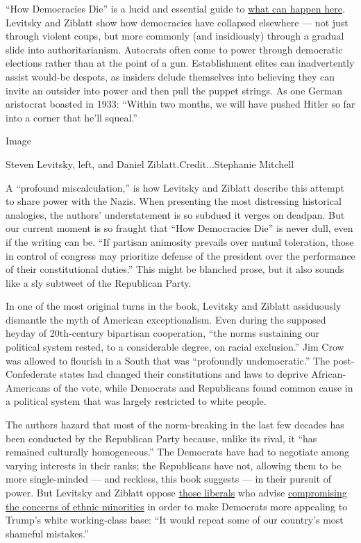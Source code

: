 ``How Democracies Die'' is a lucid and essential guide to
\href{https://www.nytimes.com/2017/01/17/books/review/classic-novel-that-predicted-trump-sinclar-lewis-it-cant-happen-here.html}{what
can happen here}. Levitsky and Ziblatt show how democracies have
collapsed elsewhere --- not just through violent coups, but more
commonly (and insidiously) through a gradual slide into
authoritarianism. Autocrats often come to power through democratic
elections rather than at the point of a gun. Establishment elites can
inadvertently assist would-be despots, as insiders delude themselves
into believing they can invite an outsider into power and then pull the
puppet strings. As one German aristocrat boasted in 1933: ``Within two
months, we will have pushed Hitler so far into a corner that he'll
squeal.''

Image

Steven Levitsky, left, and Daniel Ziblatt.Credit...Stephanie Mitchell

A ``profound miscalculation,'' is how Levitsky and Ziblatt describe this
attempt to share power with the Nazis. When presenting the most
distressing historical analogies, the authors' understatement is so
subdued it verges on deadpan. But our current moment is so fraught that
``How Democracies Die'' is never dull, even if the writing can be. ``If
partisan animosity prevails over mutual toleration, those in control of
congress may prioritize defense of the president over the performance of
their constitutional duties.'' This might be blanched prose, but it also
sounds like a sly subtweet of the Republican Party.

In one of the most original turns in the book, Levitsky and Ziblatt
assiduously dismantle the myth of American exceptionalism. Even during
the supposed heyday of 20th-century bipartisan cooperation, ``the norms
sustaining our political system rested, to a considerable degree, on
racial exclusion.'' Jim Crow was allowed to flourish in a South that was
``profoundly undemocratic.'' The post-Confederate states had changed
their constitutions and laws to deprive African-Americans of the vote,
while Democrats and Republicans found common cause in a political system
that was largely restricted to white people.

The authors hazard that most of the norm-breaking in the last few
decades has been conducted by the Republican Party because, unlike its
rival, it ``has remained culturally homogeneous.'' The Democrats have
had to negotiate among varying interests in their ranks; the Republicans
have not, allowing them to be more single-minded --- and reckless, this
book suggests --- in their pursuit of power. But Levitsky and Ziblatt
oppose
\href{https://www.nytimes.com/2016/11/20/opinion/sunday/the-end-of-identity-liberalism.html}{those
liberals} who advise
\href{https://www.nytimes.com/2017/07/06/opinion/center-democrats-identity-politics.html}{compromising
the concerns of ethnic minorities} in order to make Democrats more
appealing to Trump's white working-class base: ``It would repeat some of
our country's most shameful mistakes.''

